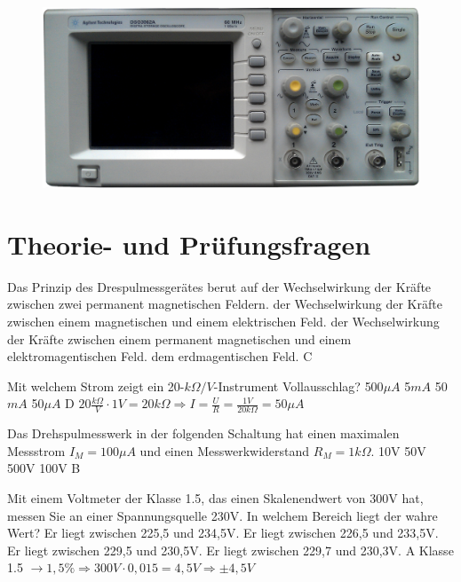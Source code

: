 \begin{figure}
 \vspace{-6cm}
 \includegraphics[scale=0.08]{Messtechnik/Bilder/oszi_foto.png}
 \vspace{-6cm}
\end{figure}

\section*{Theorie- und Prüfungsfragen} 

{Das Prinzip des Drespulmessgerätes berut auf}%
{der Wechselwirkung der Kräfte zwischen zwei permanent magnetischen Feldern.}%
{der Wechselwirkung der Kräfte zwischen einem magnetischen und einem elektrischen Feld.}%
{der Wechselwirkung der Kräfte zwischen einem permanent magnetischen und einem elektromagentischen Feld.}%
{dem erdmagentischen Feld.}%
{C}%

{Mit welchem Strom zeigt ein 20-$k\Omega/V$-Instrument Vollausschlag?}%
{500$\mu A$}%
{5$mA$}%
{50$mA$}%
{50$\mu A$}%
{D \hspace{3em} $20 \frac{k\Omega}{V} \cdot 1V = 20 k\Omega \Rightarrow
                 I = \frac{U}{R} = \frac{1V}{20k\Omega} = 50 \mu A$}%

{Das Drehspulmesswerk in der folgenden Schaltung hat einen maximalen Messstrom $I_M = 100\mu A$ und einen Messwerkwiderstand $R_M = 1 k\Omega$.}%
{10V}%
{50V}%
{500V}%
{100V}%
{B}%


{Mit einem Voltmeter der Klasse 1.5, das einen Skalenendwert von 300V hat, messen Sie an einer Spannungsquelle 230V. In welchem Bereich liegt der wahre Wert?}%
{Er liegt zwischen 225,5 und 234,5V.}%
{Er liegt zwischen 226,5 und 233,5V.}%
{Er liegt zwischen 229,5 und 230,5V.}%
{Er liegt zwischen 229,7 und 230,3V.}%
{A \hspace{3em} Klasse 1.5 $\rightarrow 1,5\% \Rightarrow
                            300V \cdot 0,015 = 4,5V \Rightarrow \pm 4,5V$ }%


